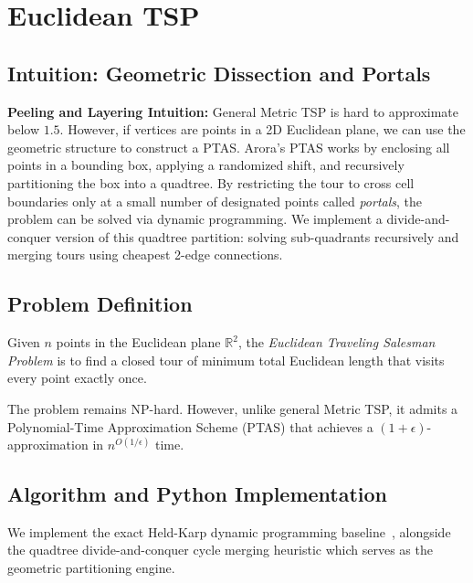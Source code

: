\chapter{Euclidean TSP}
\label{ch:euclidean_tsp}

\section{Intuition: Geometric Dissection and Portals}

\begin{intuitionbox}
\textbf{Peeling and Layering Intuition:} General Metric TSP is hard to approximate below $1.5$. However, if vertices are points in a 2D Euclidean plane, we can use the geometric structure to construct a PTAS. Arora's PTAS works by enclosing all points in a bounding box, applying a randomized shift, and recursively partitioning the box into a quadtree. By restricting the tour to cross cell boundaries only at a small number of designated points called \emph{portals}, the problem can be solved via dynamic programming. We implement a divide-and-conquer version of this quadtree partition: solving sub-quadrants recursively and merging tours using cheapest 2-edge connections.
\end{intuitionbox}

\section{Problem Definition}
Given $n$ points in the Euclidean plane $\mathbb{R}^2$, the \emph{Euclidean Traveling Salesman Problem} is to find a closed tour of minimum total Euclidean length that visits every point exactly once.

The problem remains NP-hard. However, unlike general Metric TSP, it admits a Polynomial-Time Approximation Scheme (PTAS) that achieves a $(1 + \epsilon)$-approximation in $n^{O(1/\epsilon)}$ time.

\section{Algorithm and Python Implementation}
We implement the exact Held-Karp dynamic programming baseline~\cite{held-karp62}, alongside the quadtree divide-and-conquer cycle merging heuristic which serves as the geometric partitioning engine.

